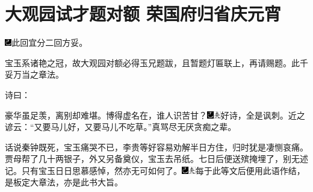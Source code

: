
\chapter{大观园试才题对额 荣国府归省庆元宵}

{\includegraphics[width=3mm]{../Images/00003}\kaishu 此回宜分二回方妥。}

{\kaishu 宝玉系诸艳之冠，故大观园对额必得玉兄题跋，且暂题灯匾联上，再请赐题。此千妥万当之章法。}

诗曰：

豪华虽足羡，离别却难堪。博得虚名在，谁人识苦甘？{\includegraphics[width=3mm]{../Images/00003}\includegraphics[width=3mm]{../Images/00012}\footnotesize \kaishu 好诗，全是讽刺。近之谚云：``又要马儿好，又要马儿不吃草。''真骂尽无厌贪痴之辈。}

话说秦钟既死，宝玉痛哭不已，李贵等好容易劝解半日方住，归时犹是凄恻哀痛。贾母帮了几十两银子，外又另备奠仪，宝玉去吊纸。七日后便送殡掩埋了，别无述记。只有宝玉日日思慕感悼，然亦无可如何了。{\includegraphics[width=3mm]{../Images/00003}\includegraphics[width=3mm]{../Images/00012}\footnotesize \kaishu 每于此等文后便用此语作结，是板定大章法，亦是此书大旨。}

